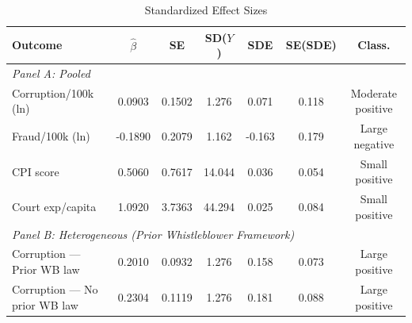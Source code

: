 \begin{table}[htbp]
\centering
\caption{Standardized Effect Sizes}
\label{tab:sde}
\footnotesize
\begin{tabular}{lcccccc}
\hline\hline
Outcome & $\hat{\beta}$ & SE & SD($Y$) & SDE & SE(SDE) & Class. \\
\hline
\multicolumn{7}{l}{\textit{Panel A: Pooled}} \\[3pt]
Corruption/100k (ln) & 0.0903 & 0.1502 & 1.276 & 0.071 & 0.118 & Moderate positive \\
Fraud/100k (ln) & -0.1890 & 0.2079 & 1.162 & -0.163 & 0.179 & Large negative \\
CPI score & 0.5060 & 0.7617 & 14.044 & 0.036 & 0.054 & Small positive \\
Court exp/capita & 1.0920 & 3.7363 & 44.294 & 0.025 & 0.084 & Small positive \\
\hline
\multicolumn{7}{l}{\textit{Panel B: Heterogeneous (Prior Whistleblower Framework)}} \\[3pt]
Corruption --- Prior WB law & 0.2010 & 0.0932 & 1.276 & 0.158 & 0.073 & Large positive \\
Corruption --- No prior WB law & 0.2304 & 0.1119 & 1.276 & 0.181 & 0.088 & Large positive \\
\hline\hline

\end{tabular}
\end{table}
